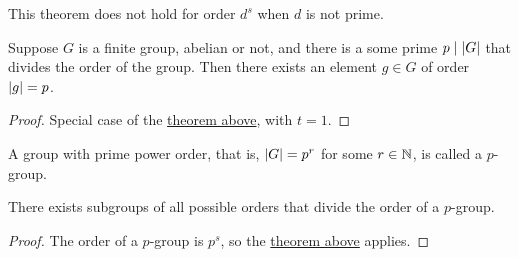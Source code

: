 \begin{remark}
    This theorem does not hold for order \(d^s\) when \(d\) is not prime.
\end{remark}
\begin{corollary}
    Suppose \(G\) is a finite group, abelian or not,
    and there is a some prime \(p \mid \abs{G}\)
    that divides the order of the group.
    Then there exists an element \(g \in G\) of order \(\abs{g} = p\).
\end{corollary}
\begin{proof}
    Special case of the \hyperref[thm:sylow-1]{theorem above},
    with \(t = 1\).
\end{proof}

\begin{definition}
    A group with prime power order,
    that is, \(\abs{G} = p^r\) for some \(r \in \mathbb{N}\),
    is called a \(p\)-group.
\end{definition}
\begin{corollary}
    There exists subgroups of all possible orders
    that divide the order of a \(p\)-group.
\end{corollary}
\begin{proof}
    The order of a \(p\)-group is \(p^s\),
    so the \hyperref[thm:sylow-1]{theorem above} applies.
\end{proof}

